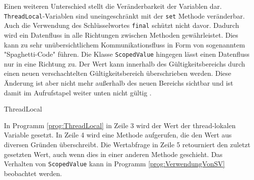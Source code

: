     Einen weiteren Unterschied stellt die Veränderbarkeit der Variablen dar. \texttt{Thread\-Local}-Variablen sind uneingeschränkt mit der \texttt{set} Methode veränderbar.
    Auch die Verwendung des Schlüsselwortes \texttt{final} schützt nicht davor. Dadurch wird ein Datenfluss in alle Richtungen zwischen Methoden gewährleistet. Dies kann zu sehr unübersichtlichem
    Kommunikationsfluss in Form von sogenanntem "Spaghetti-Code" führen. Die Klasse \texttt{ScopedValue} hingegen lässt einen Datenfluss nur in eine Richtung zu. Der Wert kann innerhalb des 
    Gültigkeitsbereichs durch einen neuen verschachtelten Gültigkeitsbereich überschrieben werden. Diese Änderung ist aber nicht mehr außerhalb des neuen Bereichs sichtbar und ist damit im Aufrufstapel weiter
    unten nicht gültig \cite{JEP481}.
    \begin{program} [H]
        \caption{ThreadLocal}
        \label{prog:ThreadLocal}
    \begin{JavaCode}[language=Java, numbers=left]
static ThreadLocal<String> threadLokal = new ThreadLocal<>();
public static void main(String[] args) {
    threadLokal.set("the negative side of Threadlocal");
    printHello();
    System.out.println(STR."This is a Methode to show \{threadLokal.get()}");
    threadLokal.remove();
}

public static void printHello() {
    threadLokal.set(Thread.currentThread().toString());
    System.out.println(STR."Hello from \{threadLokal.get()}");
}\end{JavaCode}
    \end{program}
    In Programm \ref{prog:ThreadLocal} in Zeile 3 wird der Wert der thread-lokalen Variable gesetzt. In Zeile 4 wird eine Methode aufgerufen, die den Wert aus diversen Gründen überschreibt. Die Wertabfrage in Zeile 5
    retourniert den zuletzt gesetzten Wert, auch wenn dies in einer anderen Methode geschieht. Das Verhalten von \texttt{ScopedValue} kann in Programm \ref{prog:VerwendungVonSV} beobachtet werden.



